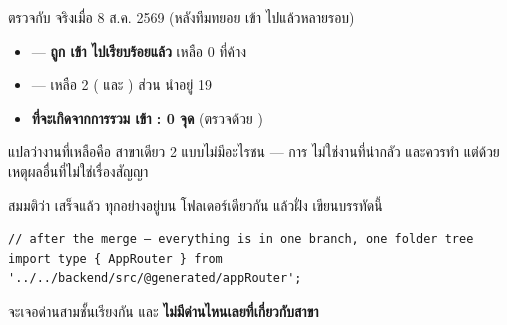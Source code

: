 \begin{goodbox}[title={ข่าวดีก่อน: งาน \en{merge} เหลือน้อยกว่าที่คิด และไม่มี \en{conflict}}]
ตรวจกับ  จริงเมื่อ 8 ส.ค. 2569 (หลังทีมทยอย  เข้า
 ไปแล้วหลายรอบ)

\begin{itemize}
\item {} --- \textbf{ถูก  เข้า 
      ไปเรียบร้อยแล้ว} เหลือ 0  ที่ค้าง
\item {} --- เหลือ 2  (
      และ ) ส่วน  นำอยู่ 19 
\item \textbf{ ที่จะเกิดจากการรวม  เข้า
      : 0 จุด} (ตรวจด้วย )
\end{itemize}

แปลว่างานที่เหลือคือ  สาขาเดียว 2  แบบไม่มีอะไรชน ---
การ  ไม่ใช่งานที่น่ากลัว และควรทำ แต่ด้วยเหตุผลอื่นที่ไม่ใช่เรื่องสัญญา
\end{goodbox}

สมมติว่า  เสร็จแล้ว ทุกอย่างอยู่บน  โฟลเดอร์เดียวกัน
แล้วฝั่ง  เขียนบรรทัดนี้

\begin{lstlisting}
// after the merge — everything is in one branch, one folder tree
import type { AppRouter } from '../../backend/src/@generated/appRouter';
\end{lstlisting}

จะเจอด่านสามชั้นเรียงกัน และ \textbf{ไม่มีด่านไหนเลยที่เกี่ยวกับสาขา }

